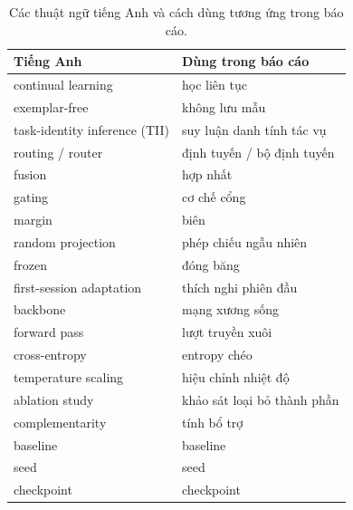 \documentclass[11pt,a4paper]{article}
\begin{document}
\begin{table}[htbp]
\centering
\caption{Các thuật ngữ tiếng Anh và cách dùng tương ứng trong báo cáo.}
\label{tab:glossary}
\begin{tabular}{ll}
\toprule
Tiếng Anh & Dùng trong báo cáo \\
\midrule
continual learning              & học liên tục \\
exemplar-free                   & không lưu mẫu \\
task-identity inference (TII)   & suy luận danh tính tác vụ \\
routing / router                & định tuyến / bộ định tuyến \\
fusion                          & hợp nhất \\
gating                          & cơ chế cổng \\
margin                          & biên \\
random projection               & phép chiếu ngẫu nhiên \\
frozen                          & đóng băng \\
first-session adaptation        & thích nghi phiên đầu \\
backbone                        & mạng xương sống \\
forward pass                    & lượt truyền xuôi \\
cross-entropy                   & entropy chéo \\
temperature scaling             & hiệu chỉnh nhiệt độ \\
ablation study                  & khảo sát loại bỏ thành phần \\
complementarity                 & tính bổ trợ \\
baseline                        & baseline \\
seed                            & seed \\
checkpoint                      & checkpoint \\
\bottomrule
\end{tabular}
\end{table}

\end{document}
